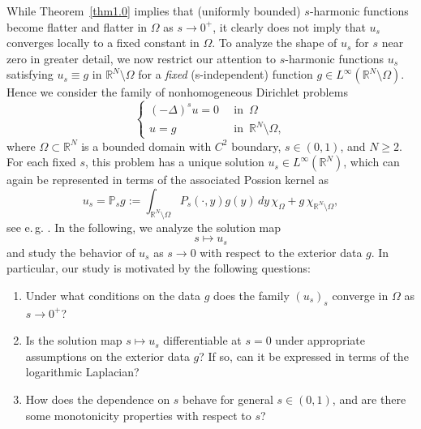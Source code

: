 \documentclass[notitlepage,11pt,reqno]{amsart}
\theoremstyle{definition}
\numberwithin{equation}{section}
\newcommand{\RRN}{\mathds{R}^{N}}
\newcommand{\R}{\mathds{R}}
\newcommand{\RR}{\mathds{R}}
\newcommand{\PP}{\mathbb{P}}
\begin{document}
While Theorem~\ref{thm1.0} implies that (uniformly bounded) $s$-harmonic functions become flatter and flatter in $\Omega$ as $s \to 0^+$, it clearly does not imply that $u_s$ converges locally to a fixed constant in $\Omega$. To analyze the shape of $u_s$ for $s$ near zero in greater detail, we now restrict our attention to $s$-harmonic functions $u_s$ satisfying $u_s \equiv g$ in $\R^N \setminus \Omega$ for a {\em fixed} (s-independent) function $g \in L^\infty(\R^N \setminus \Omega)$. Hence we consider the family of nonhomogeneous Dirichlet problems
\begin{equation}\label{main eq}
\begin{cases}
    (-\Delta)^s u =0\,\,\, &\text{in}\,\,\, \Omega\\
    u=g\,\,\, &\text{in}\,\,\, \RRN\setminus\Omega,
\end{cases}
\end{equation}
where $\Omega \subset \RRN$ is a bounded domain with $C^2$ boundary, $s\in (0, 1)$, and $N\geq 2$. For each fixed $s$, this problem has a unique solution $u_s \in L^\infty(\R^N)$, which can again be represented in terms of the associated Possion kernel as
\begin{equation}\label{intro-def-poisson}
    u_s=\PP_sg:=\int_{\RR^N\setminus \Omega}P_s(\cdot, y) g(y)\, dy\, \chi_{\Omega} +g\, \chi_{\RR^N\setminus\Omega},
\end{equation}
see e.\,g. \cite{BKK08}. In the following, we analyze the solution map 
\[
s \mapsto u_s
\]  
and study the behavior of $u_s$ as $s\to 0$ with respect to the exterior data $g$. In particular, our study is motivated by the following questions:\\[-0.2cm] 
\begin{center}
\begin{minipage}{14cm}
 \begin{enumerate}
    \item[{\bf Question 1.}] Under what conditions on the data $g$ does the family $(u_s)_s$ converge in $\Omega$ as $s \to 0^+$?\\[-0.2cm] 
    \item[{\bf Question 2.}] Is the solution map $s \mapsto u_s$ differentiable at $s=0$ under appropriate assumptions on the exterior data $g$? If so, can it be expressed in terms of the logarithmic Laplacian?\\[-0.2cm] 
    \item[{\bf Question 3.}] How does the dependence on $s$ behave for general $s \in (0,1)$, and are there some monotonicity properties with respect to $s$?\\[-0.2cm] 
\end{enumerate}   
\end{minipage}
\end{center}
\end{document}
